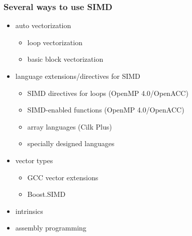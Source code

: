\documentclass[12pt,dvipdfmx]{beamer}
\newcommand{\ao}[1]{{\color{blue}#1}}
\begin{document}
\begin{frame}[fragile]
\frametitle{Several ways to use SIMD}

\begin{itemize}
\item auto vectorization
  \begin{itemize}
  \item \ao{loop vectorization}
  \item basic block vectorization
  \end{itemize}

\item language extensions/directives for SIMD
  \begin{itemize}
  \item \ao{SIMD directives for loops (OpenMP 4.0/OpenACC)}
  \item \ao{SIMD-enabled functions (OpenMP 4.0/OpenACC)}
  \item array languages (Cilk Plus)
  \item specially designed languages
  \end{itemize}

\item vector types
  \begin{itemize}
  \item \ao{GCC vector extensions}
  \item Boost.SIMD
  \end{itemize}

\item \ao{intrinsics} 

\item assembly programming
\end{itemize}

\end{frame}

\end{document}
